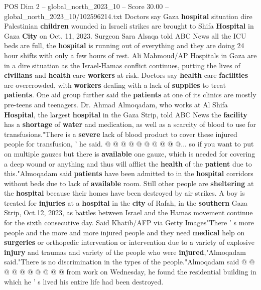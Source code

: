 \begin{textsample}{POS Dim 2 – global\_north\_2023\_10 – Score 30.00 – global\_north\_2023\_10/102596214.txt}  \label{ex:f2_pos_286}
Doctors say Gaza \textbf{hospital} situation dire Palestinian \textbf{children} wounded in Israeli strikes are brought to Shifa \textbf{Hospital} in Gaza \textbf{City} on Oct. 11, 2023.
Surgeon Sara Alsaqa told ABC News all the ICU beds are full, the \textbf{hospital} is running out of everything and they are doing 24 hour shifts with only a few hours of rest.
Ali Mahmoud/AP Hospitals in Gaza are in a dire situation as the Israel-Hamas conflict continues, putting the lives of \textbf{civilians} and \textbf{health} care \textbf{workers} at risk.
Doctors say \textbf{health} care \textbf{facilities} are overcrowded, with \textbf{workers} dealing with a lack of \textbf{supplies} to treat \textbf{patients}.
One aid group further said the \textbf{patients} at one of its clinics are mostly pre-teens and teenagers.
Dr.
Ahmad Almoqadam, who works at Al Shifa \textbf{Hospital}, the largest \textbf{hospital} in the Gaza Strip, told ABC News the \textbf{facility} has a \textbf{shortage} of \textbf{water} and medication, as well as a scarcity of blood to use for transfusions."There is a \textbf{severe} lack of blood product to cover these injured people for transfusion, ' he said. @ @ @ @ @ @ @ @ @ @... so if you want to put on multiple gauzes but there is \textbf{available} one gauze, which is needed for covering a deep wound or anything and thus will afflict the \textbf{health} of the \textbf{patient} due to this."Almoqadam said \textbf{patients} have been admitted to in the \textbf{hospital} corridors without beds due to lack of \textbf{available} room.
Still other people are \textbf{sheltering} at the \textbf{hospital} because their homes have been destroyed by air strikes.
A boy is treated for \textbf{injuries} at a \textbf{hospital} in the \textbf{city} of Rafah, in the \textbf{southern} Gaza Strip, Oct.12, 2023, as battles between Israel and the Hamas movement continue for the sixth consecutive day.
Said Khatib/AFP via Getty Images"There ' s more people and the more and more injured people and they need \textbf{medical} help on \textbf{surgeries} or orthopedic intervention or intervention due to a variety of explosive \textbf{injury} and traumas and variety of the people who were \textbf{injured},"Almoqadam said."There is no discrimination in the types of the people."Almoqadam said @ @ @ @ @ @ @ @ @ @ from work on Wednesday, he found the residential building in which he ' s lived his entire life had been destroyed.

\end{textsample}
